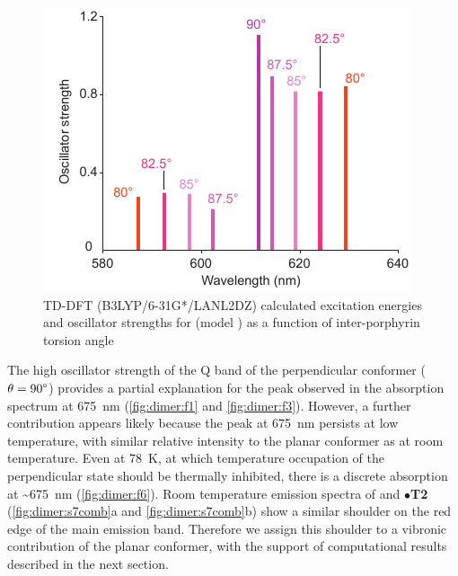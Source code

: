 		\begin{figure}[ht!]
			\centering\includegraphics{figures/dimer/si-small-angles-f2.pdf} 
			\caption[]{TD-DFT (B3LYP/6-31G*/LANL2DZ) calculated excitation energies and oscillator strengths for  (model ) as a function of inter-­porphyrin torsion angle}
			\label{fig:dimer:s2}
		\end{figure}

		The high oscillator strength of the Q band of the perpendicular conformer ($\theta = 90\degree$) provides a partial explanation for the peak observed in the absorption spectrum at \SI{675}{\nano\metre} (\figplural \ref{fig:dimer:f1} and \ref{fig:dimer:f3}). However, a further contribution appears likely because the peak at \SI{675}{\nano\metre} persists at low temperature, with similar relative intensity to the planar conformer as at room temperature. Even at \SI{78}{\kelvin}, at which temperature occupation of the perpendicular state should be thermally inhibited, there is a discrete absorption at \textasciitilde{}\SI{675}{\nano\metre} (\autoref{fig:dimer:f6}). Room temperature emission spectra of \p2 and $\bullet$\textbf{T2} (\figplural \ref{fig:dimer:s7comb}a and \ref{fig:dimer:s7comb}b) show a similar shoulder on the red edge of the main emission band. Therefore we assign this shoulder to a vibronic contribution of the planar conformer, with the support of computational results described in the next section.

